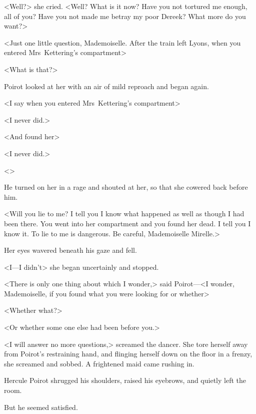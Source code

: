 <Well?> she cried. <Well? What is it now? Have you not tortured me enough, all of you? Have you not made me betray my poor Dereek? What more do you want?>

<Just one little question, Mademoiselle. After the train left Lyons, when you entered Mrs~Kettering's compartment\longdash>

<What is that?>

Poirot looked at her with an air of mild reproach and began again.

<I say when you entered Mrs~Kettering's compartment\longdash>

<I never did.>

<And found her\longdash>

<I never did.>

<>

He turned on her in a rage and shouted at her, so that she cowered back before him.

<Will you lie to me? I tell you I know what happened as well as though I had been there. You went into her compartment and you found her dead. I tell you I know it. To lie to me is dangerous. Be careful, Mademoiselle Mirelle.>

Her eyes wavered beneath his gaze and fell.

<I—I didn't\longdash> she began uncertainly and stopped.

<There is only one thing about which I wonder,> said Poirot—<I wonder, Mademoiselle, if you found what you were looking for or whether\longdash>

<Whether what?>

<Or whether some one else had been before you.>

<I will answer no more questions,> screamed the dancer. She tore herself away from Poirot's restraining hand, and flinging herself down on the floor in a frenzy, she screamed and sobbed. A frightened maid came rushing in.

Hercule Poirot shrugged his shoulders, raised his eyebrows, and quietly left the room.

But he seemed satisfied.